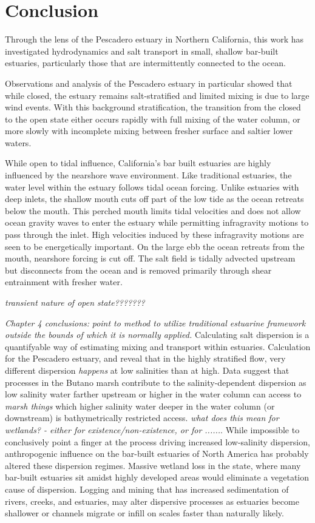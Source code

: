 \chapter{Conclusion}
\label{conclusion}

Through the lens of the Pescadero estuary in Northern California, this work has investigated hydrodynamics and salt transport in small, shallow bar-built estuaries, particularly those that are intermittently connected to the ocean. 

Observations and analysis of the Pescadero estuary in particular showed that while closed, the estuary remains salt-stratified and limited mixing is due to large wind events. With this background stratification, the transition from the closed to the open state either occurs rapidly with full mixing of the water column, or more slowly with incomplete mixing between fresher surface and saltier lower waters. 

While open to tidal influence, California's bar built estuaries are highly influenced by the nearshore wave environment. Like traditional estuaries, the water level within the estuary follows tidal ocean forcing. Unlike estuaries with deep inlets, the shallow mouth cuts off part of the low tide as the ocean retreats below the mouth. This perched mouth limits tidal velocities and does not allow ocean gravity waves to enter the estuary while permitting infragravity motions to pass through the inlet. High velocities induced by these infragravity motions are seen to be energetically important. On the large ebb the ocean retreats from the mouth, nearshore forcing is cut off. The salt field is tidally advected upstream but disconnects from the ocean and is removed primarily through shear entrainment with fresher water. 

\emph{transient nature of open state???????}


\emph{Chapter 4 conclusions:} \emph{point to method to utilize traditional estuarine framework outside the bounds of which it is normally applied.}
Calculating salt dispersion is a quantifyable way of estimating mixing and transport within estuaries. Calculation for the Pescadero estuary, and reveal that in the highly stratified flow, very different dispersion \emph{happens} at low salinities than at high. Data suggest that processes in the Butano marsh contribute to the salinity-dependent dispersion as low salinity water farther upstream or higher in the water column can access to \emph{marsh things} which higher salinity water deeper in the water column (or downstream) is bathymetrically restricted access.  \emph{what does this mean for wetlands? - either for existence/non-existence, or for ......}.  While impossible to conclusively point a finger at the process driving increased low-salinity dispersion, anthropogenic influence on the bar-built estuaries of North America has probably altered these dispersion regimes. Massive wetland loss in the state, where many bar-built estuaries sit amidst highly developed areas would eliminate a vegetation cause of dispersion. Logging and mining that has increased sedimentation of rivers, creeks, and estuaries, may alter dispersive processes as estuaries become shallower or channels migrate or infill on scales faster than naturally likely.  

